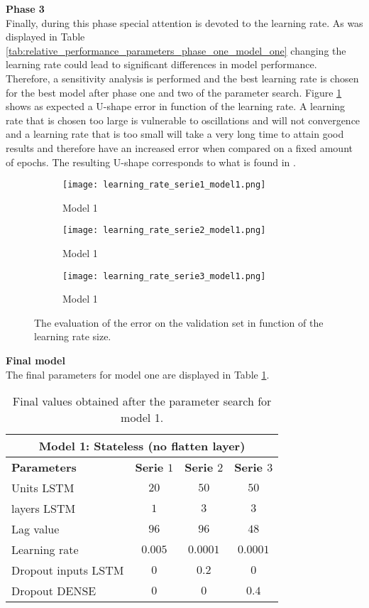 \textbf{Phase 3}\\
Finally, during this phase special attention is devoted to the learning rate. As was displayed in Table \ref{tab:relative_performance_parameters_phase_one_model_one} changing the learning rate could lead to significant differences in model performance. Therefore, a sensitivity analysis is performed and the best learning rate is chosen for the best model after phase one and two of the parameter search. Figure \ref{fig:learning_rate_model1} shows as expected a U-shape error in function of the learning rate. A learning rate that is chosen too large is vulnerable to oscillations and will not convergence and a learning rate that is too small will take a very long time to attain good results and therefore have an increased error when compared on a fixed amount of epochs. The resulting U-shape corresponds to what is found in \cite{Greff2017} .\\

\begin{figure}[h]
	\centering
	\begin{subfigure}{0.49\linewidth}
		\texttt{[image: learning\_rate\_serie1\_model1.png]}
		\caption{Model 1}
	\end{subfigure}	
	\begin{subfigure}{0.49\linewidth}
		\texttt{[image: learning\_rate\_serie2\_model1.png]}
		\caption{Model 1}
	\end{subfigure}
	\begin{subfigure}{0.5\linewidth}
		\texttt{[image: learning\_rate\_serie3\_model1.png]}
		\caption{Model 1}
	\end{subfigure}
	\caption{The evaluation of the error on the validation set in function of the learning rate size.}
	\label{fig:learning_rate_model1}
\end{figure}


\textbf{Final model}\\
The final parameters for model one are displayed in Table \ref{tab:final_model1}.

\begin{table}[h]
	\centering
	\begin{tabular}{@{}l|ccc@{}} \toprule
		\multicolumn{4}{c}{Model 1: Stateless (no flatten layer)}\\\midrule\midrule
		\textbf{Parameters}	& \textbf{Serie $ 1 $} & \textbf{Serie $ 2 $} & \textbf{Serie $ 3 $}\\\midrule
		Units LSTM & $20 $&$ 50 $  & $50 $\\
		layers LSTM & $1 $&$ 3 $  & $3$\\
		Lag value & $96 $&$ 96$  & $48$\\
		Learning rate & $0.005 $&$ 0.0001$  & $0.0001$\\\hline
		Dropout inputs LSTM   & $ 0 $ & $ 0.2 $ & $ 0 $\\
		Dropout DENSE   & $ 0 $ & $ 0 $ & $ 0.4 $\\\bottomrule
	\end{tabular}
	\caption{Final values obtained after the parameter search for model 1.}
	\label{tab:final_model1}
\end{table}



